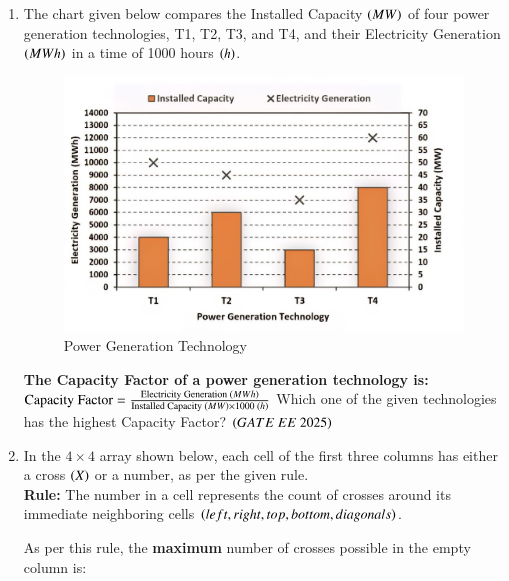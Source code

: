\documentclass[journal,12pt,onecolumn]{IEEEtran}
\theoremstyle{remark}
\begin{document}
\begin{enumerate}
   \item The chart given below compares the Installed Capacity  $\left(MW\right)$ of four power generation technologies, T1, T2, T3, and T4, and their Electricity Generation  $\left(MWh\right)$ in a time of 1000 hours  $\left(h\right)$.
   \begin{figure}
\includegraphics[scale=0.25]{figs/Q8.jpg}
\caption{Power Generation Technology}
\label{Q8}
\end{figure}
\textbf{The Capacity Factor of a power generation technology is:}
$
\text{Capacity Factor} = \frac{\text{Electricity Generation  $\left(MWh\right)$}}{\text{Installed Capacity  $\left(MW\right)$} \times 1000 \text{  $\left(h\right)$}}
$
 Which one of the given technologies has the highest Capacity Factor? 
\hfill $\left(GATE\ EE\ 2025\right)$
\begin{enumerate}
    \end{enumerate}

   \item In the $4 \times 4$ array shown below, each cell of the first three columns has either a cross  $\left(X\right)$ or a number, as per the given rule. \\

\textbf{Rule:} The number in a cell represents the count of crosses around its immediate neighboring cells $\left(left, right, top, bottom, diagonals\right)$.

 

As per this rule, the \textbf{maximum} number of crosses possible in the empty column is:
   

\end{enumerate}
\end{document}
